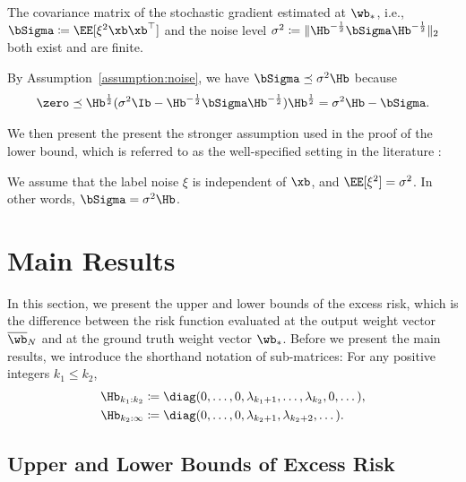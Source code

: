 \documentclass[11pt]{article}
\newcommand{\owb}{\overline{\wb}}
\begin{document}
\begin{assumption}\label{assumption:noise}
The covariance matrix of the stochastic gradient estimated at $\wb_*$, i.e., $\bSigma\coloneqq\EE[\xi^2\xb\xb^\top]$ and the noise level $\sigma^2\coloneqq\|\Hb^{-\frac12}\bSigma\Hb^{-\frac12}\|_2$
both exist and are finite.
\end{assumption}
By Assumption~\ref{assumption:noise}, we have $\bSigma\preceq\sigma^2\Hb$ because
\begin{align}\label{eq:Sigma_bound}
\zero\preceq\Hb^{\frac12}(\sigma^2\Ib-\Hb^{-\frac12}\bSigma\Hb^{-\frac12})\Hb^{\frac12}=\sigma^2\Hb-\bSigma.
\end{align}

We then present the present the stronger assumption used in the proof of the lower bound, which is referred to as the well-specified setting in the literature \citep{zou2021benign}:
\begin{assumption}\label{assumption:noise_lower}
We assume that the label noise $\xi$ is independent of $\xb$, and $\EE[\xi^2]=\sigma^2$. In other words, $\bSigma=\sigma^2\Hb$.
\end{assumption}

\section{Main Results}

In this section, we present the upper and lower bounds of the excess risk, which is the difference between the risk function evaluated at the output weight vector $\owb_N$ and at the ground truth weight vector $\wb_*$. Before we present the main results, we introduce the shorthand notation of sub-matrices: For any positive integers $k_1\le k_2$,
\begin{align*}
\Hb_{k_1:k_2}&\coloneqq\diag(0, \dots, 0, \lambda_{k_1+1}, \dots, \lambda_{k_2}, 0, \dots),\\
\Hb_{k_2:\infty}&\coloneqq\diag(0, \dots, 0, \lambda_{k_2+1}, \lambda_{k_2+2}, \dots).
\end{align*}


\subsection{Upper and Lower Bounds of Excess Risk}\label{subsection:upper_lower_bounds}
\end{document}
